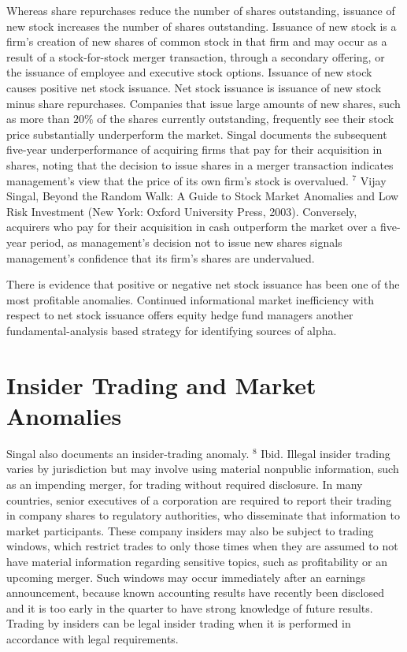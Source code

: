 \documentclass[11pt]{article}
\begin{document}
Whereas share repurchases reduce the number of shares outstanding, issuance of new stock increases the number of shares outstanding. Issuance of new stock is a firm's creation of new shares of common stock in that firm and may occur as a result of a stock-for-stock merger transaction, through a secondary offering, or the issuance of employee and executive stock options. Issuance of new stock causes positive net stock issuance. Net stock issuance is issuance of new stock minus share repurchases. Companies that issue large amounts of new shares, such as more than $20 \%$ of the shares currently outstanding, frequently see their stock price substantially underperform the market. Singal documents the subsequent five-year underperformance of acquiring firms that pay for their acquisition in shares, noting that the decision to issue shares in a merger transaction indicates management's view that the price of its own firm's stock is overvalued. ${ }^{7}$ Vijay Singal, Beyond the Random Walk: A Guide to Stock Market Anomalies and Low Risk Investment (New York: Oxford University Press, 2003). Conversely, acquirers who pay for their acquisition in cash outperform the market over a five-year period, as management's decision not to issue new shares signals management's confidence that its firm's shares are undervalued.

There is evidence that positive or negative net stock issuance has been one of the most profitable anomalies. Continued informational market inefficiency with respect to net stock issuance offers equity hedge fund managers another fundamental-analysis based strategy for identifying sources of alpha.

\section*{Insider Trading and Market Anomalies}
Singal also documents an insider-trading anomaly. ${ }^{8}$ Ibid. Illegal insider trading varies by jurisdiction but may involve using material nonpublic information, such as an impending merger, for trading without required disclosure. In many countries, senior executives of a corporation are required to report their trading in company shares to regulatory authorities, who disseminate that information to market participants. These company insiders may also be subject to trading windows, which restrict trades to only those times when they are assumed to not have material information regarding sensitive topics, such as profitability or an upcoming merger. Such windows may occur immediately after an earnings announcement, because known accounting results have recently been disclosed and it is too early in the quarter to have strong knowledge of future results. Trading by insiders can be legal insider trading when it is performed in accordance with legal requirements.
\end{document}
